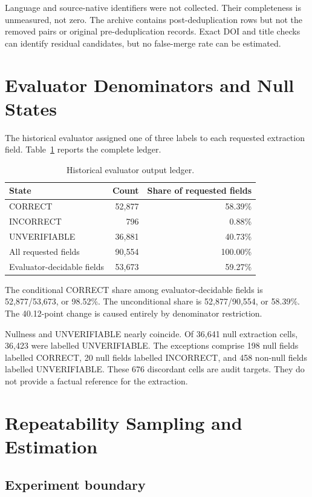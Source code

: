 \documentclass[acmsmall,anonymous,review]{acmart}
\begin{document}
Language and source-native identifiers were not collected. Their completeness is unmeasured, not zero. The archive contains post-deduplication rows but not the removed pairs or original pre-deduplication records. Exact DOI and title checks can identify residual candidates, but no false-merge rate can be estimated.

\section{Evaluator Denominators and Null States}

The historical evaluator assigned one of three labels to each requested extraction field. Table~\ref{tab:evaluator} reports the complete ledger.

\begin{table}[h]
\caption{Historical evaluator output ledger.}
\label{tab:evaluator}
\begin{tabular}{lrr}
\toprule
\textbf{State} & \textbf{Count} & \textbf{Share of requested fields} \\
\midrule
CORRECT & 52,877 & 58.39\% \\
INCORRECT & 796 & 0.88\% \\
UNVERIFIABLE & 36,881 & 40.73\% \\
\midrule
All requested fields & 90,554 & 100.00\% \\
Evaluator-decidable fields & 53,673 & 59.27\% \\
\bottomrule
\end{tabular}
\end{table}

The conditional CORRECT share among evaluator-decidable fields is 52,877/53,673, or 98.52\%. The unconditional share is 52,877/90,554, or 58.39\%. The 40.12-point change is caused entirely by denominator restriction.

Nullness and UNVERIFIABLE nearly coincide. Of 36,641 null extraction cells, 36,423 were labelled UNVERIFIABLE. The exceptions comprise 198 null fields labelled CORRECT, 20 null fields labelled INCORRECT, and 458 non-null fields labelled UNVERIFIABLE. These 676 discordant cells are audit targets. They do not provide a factual reference for the extraction.

\section{Repeatability Sampling and Estimation}

\subsection{Experiment boundary}
\end{document}
